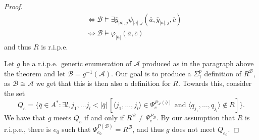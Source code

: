 \documentclass[10pt,a4paper]{amsart}
\newcommand{\A}{{\mathcal{A}}}
\newcommand{\B}{{\mathcal{B}}}
\renewcommand{\bar}[1]{\overline{#1}}
\renewcommand{\phi}{\varphi}
\begin{document}
\begin{proof}
\begin{align*}
    &\Leftrightarrow \B\models \exists \overline y_{|\overline a|,j}\psi_{|\overline a|,j}(\overline a, \overline y_{|\overline a|,j},\overline c)\\
    &\Leftrightarrow \B\models \phi_{|\overline a|}(\bar a, \bar c)
\end{align*}
and thus $R$ is r.i.p.e.

Let $g$ be a r.i.p.e.\ generic enumeration of $\A$ produced as in the paragraph above the theorem and let $\B=g^{-1}(\A)$. Our goal is to produce a $\Sigma^p_1$ definition of $R^\B$, as $\B\cong \A$ we get that this is then also a definition for $R$. %
%
Towards this, consider the set
\begin{equation*}
    Q_e = \{ \overline{q} \in A^* : \exists l, j_1 ,\dots j_l < |\overline{q}| \, [\langle j_1,\dots, j_l \rangle \in \Psi_e^{P_\A(\overline{q})} \text{ and } \langle q_{j_1},\dots, q_{j_l} \rangle \not \in R] \}.
\end{equation*}
We have that $g$ meets $Q_e$ if and only if $R^\B\neq \Psi_e^{P_\B}$. By our assumption that $R$ is r.i.p.e., there is $e_0$ such that $\Psi^{P(\B)}_{e_0}=R^\B$, and thus $g$ does not meet $Q_{e_0}$.


\end{proof}
\end{document}
